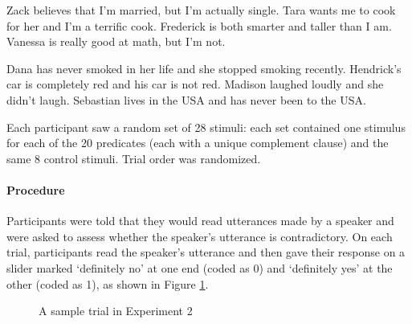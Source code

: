 \documentclass[11pt,fleqn]{article}
\newcommand{\6}{\mbox{$[\hspace*{-.6mm}[$}}
\newcommand{\9}{\mbox{$]\hspace*{-.6mm}]$}}
\begin{document}
\begin{exe}
\ex\label{control-good2}
\begin{xlist}
\ex Zack believes that I'm married, but I'm actually single.
\ex Tara wants me to cook for her and I'm a terrific cook.
\ex Frederick is both smarter and taller than I am.
\ex Vanessa is really good at math, but I'm not.
\end{xlist}
\ex\label{control-bad2}
\begin{xlist}
\ex Dana has never smoked in her life and she stopped smoking recently.
\ex Hendrick's car is completely red and his car is not red.
\ex Madison laughed loudly and she didn't laugh.
\ex Sebastian lives in the USA and has never been to the USA.
\end{xlist}
\end{exe}

Each participant saw a random set of 28 stimuli: each set contained one stimulus for each of the 20 predicates (each with a unique complement clause) and the same 8 control stimuli. Trial order was randomized.


\paragraph{Procedure} Participants were told that they would read utterances made by a speaker and were asked to assess whether the speaker's utterance is contradictory. On each trial, participants read the speaker's utterance and then gave their response on a slider marked `definitely no' at one end (coded as 0) and `definitely yes' at the other (coded as 1), as shown in Figure \ref{f-trial-exp3}.

\begin{figure}[h!]
\begin{center}
\end{center}
\caption{A sample trial in Experiment 2}\label{f-trial-exp3}
\end{figure}
\end{document}
